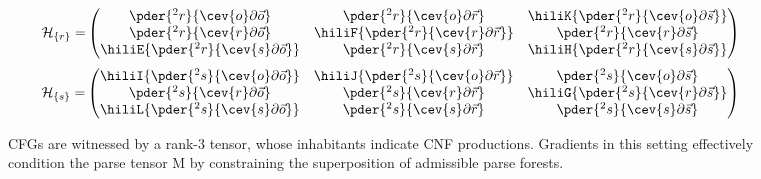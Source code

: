 \begin{figure}
\begin{minipage}[l]{4.3cm}
{}
  \end{minipage}
  \begin{minipage}[c]{3.5cm}
    \begin{align*}
      \mathcal{H}_{\{r\}} = & \begin{pmatrix}
                                \pder{^2 r}{\cev{o}\partial\vec{o}} & \pder{^2 r}{\cev{o}\partial\vec{r}} & \hiliK{\pder{^2 r}{\cev{o}\partial\vec{s}}}\\
                                \pder{^2 r}{\cev{r}\partial\vec{o}} & \hiliF{\pder{^2 r}{\cev{r}\partial\vec{r}}} & \pder{^2 r}{\cev{r}\partial\vec{s}}\\
                                \hiliE{\pder{^2 r}{\cev{s}\partial\vec{o}}} & \pder{^2 r}{\cev{s}\partial\vec{r}} & \hiliH{\pder{^2 r}{\cev{s}\partial\vec{s}}}
      \end{pmatrix}
    \end{align*}
    \begin{align*}
      \mathcal{H}_{\{s\}} = & \begin{pmatrix}
                                \hiliI{\pder{^2 s}{\cev{o}\partial\vec{o}}} & \hiliJ{\pder{^2 s}{\cev{o}\partial\vec{r}}} & \pder{^2 s}{\cev{o}\partial\vec{s}}\\
                                \pder{^2 s}{\cev{r}\partial\vec{o}} & \pder{^2 s}{\cev{r}\partial\vec{r}} & \hiliG{\pder{^2 s}{\cev{r}\partial\vec{s}}}\\
                                \hiliL{\pder{^2 s}{\cev{s}\partial\vec{o}}} & \pder{^2 s}{\cev{s}\partial\vec{r}} & \pder{^2 s}{\cev{s}\partial\vec{s}}
      \end{pmatrix}
    \end{align*}
  \end{minipage}
  \caption{CFGs are witnessed by a rank-3 tensor, whose inhabitants indicate CNF productions. Gradients in this setting effectively condition the parse tensor M by constraining the superposition of admissible parse forests.\vspace{-10pt}}
\end{figure}